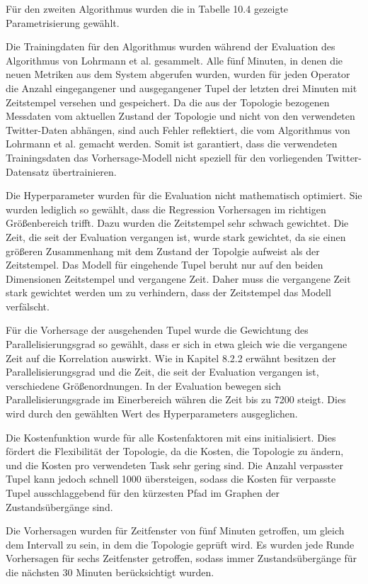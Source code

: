 Für den zweiten Algorithmus wurden die in Tabelle 10.4 gezeigte Parametrisierung gewählt.

Die Trainingdaten für den Algorithmus wurden während der Evaluation des Algorithmus von Lohrmann et al. gesammelt.
Alle fünf Minuten, in denen die neuen Metriken aus dem System abgerufen wurden, wurden für jeden Operator die Anzahl eingegangener und ausgegangener Tupel der letzten drei Minuten mit Zeitstempel versehen und gespeichert.
Da die aus der Topologie bezogenen Messdaten vom aktuellen Zustand der Topologie und nicht von den verwendeten Twitter-Daten abhängen, sind auch Fehler reflektiert, die vom Algorithmus von Lohrmann et al. gemacht werden.
Somit ist garantiert, dass die verwendeten Trainingsdaten das Vorhersage-Modell nicht speziell für den vorliegenden Twitter-Datensatz übertrainieren.

Die Hyperparameter wurden für die Evaluation nicht mathematisch optimiert.
Sie wurden lediglich so gewählt, dass die Regression Vorhersagen im richtigen Größenbereich trifft.
Dazu wurden die Zeitstempel sehr schwach gewichtet.
Die Zeit, die seit der Evaluation vergangen ist, wurde stark gewichtet, da sie einen größeren Zusammenhang mit dem Zustand der Topolgie aufweist als der Zeitstempel.
Das Modell für eingehende Tupel beruht nur auf den beiden Dimensionen Zeitstempel und vergangene Zeit.
Daher muss die vergangene Zeit stark gewichtet werden um zu verhindern, dass der Zeitstempel das Modell verfälscht.

Für die Vorhersage der ausgehenden Tupel wurde die Gewichtung des Parallelisierungsgrad so gewählt, dass er sich in etwa gleich wie die vergangene Zeit auf die Korrelation auswirkt.
Wie in Kapitel 8.2.2 erwähnt besitzen der Parallelisierungsgrad und die Zeit, die seit der Evaluation vergangen ist, verschiedene Größenordnungen.
In der Evaluation bewegen sich Parallelisierungsgrade im Einerbereich währen die Zeit bis zu 7200 steigt.
Dies wird durch den gewählten Wert des Hyperparameters ausgeglichen.

Die Kostenfunktion wurde für alle Kostenfaktoren mit eins initialisiert.
Dies fördert die Flexibilität der Topologie, da die Kosten, die Topologie zu ändern, und die Kosten pro verwendeten Task sehr gering sind.
Die Anzahl verpasster Tupel kann jedoch schnell 1000 übersteigen, sodass die Kosten für verpasste Tupel ausschlaggebend für den kürzesten Pfad im Graphen der Zustandsübergänge sind.

Die Vorhersagen wurden für Zeitfenster von fünf Minuten getroffen, um gleich dem Intervall zu sein, in dem die Topologie geprüft wird.
Es wurden jede Runde Vorhersagen für sechs Zeitfenster getroffen, sodass immer Zustandsübergänge für die nächsten 30 Minuten berücksichtigt wurden.

